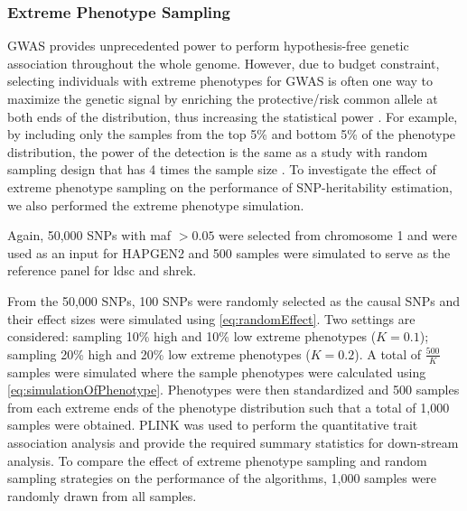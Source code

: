 \documentclass[12pt]{scrbook}
\begin{document}
\subsubsection{Extreme Phenotype Sampling}
\gls{GWAS} provides unprecedented power to perform hypothesis-free genetic association throughout the whole genome.
However, due to budget constraint, selecting individuals with extreme phenotypes for \gls{GWAS} is often one way to maximize the genetic signal by enriching the protective/risk common allele at both ends of the distribution, thus increasing the statistical power \citep{Guey2011}.
For example, by including only the samples from the top 5\% and bottom 5\% of the phenotype distribution, the power of the detection is the same as a study with random sampling design that has 4 times the sample size \citep{Sham2014}. 
To investigate the effect of extreme phenotype sampling on the performance of \gls{SNP}-heritability estimation, we also performed the extreme phenotype simulation. 

Again, 50,000 \glspl{SNP} with \gls{maf} $>0.05$ were selected from chromosome 1 and were used as an input for HAPGEN2 and 500 samples were simulated to serve as the reference panel for \gls{ldsc} and \gls{shrek}.

From the 50,000 \glspl{SNP}, 100 \glspl{SNP} were randomly selected as the causal \glspl{SNP} and their effect sizes were simulated using \cref{eq:randomEffect}.
Two settings are considered: sampling 10\% high and 10\% low extreme phenotypes ($K=0.1$); sampling 20\% high and 20\% low extreme phenotypes ($K=0.2$).
A total of $\frac{500}{K}$ samples were simulated where the sample phenotypes were calculated using \cref{eq:simulationOfPhenotype}.
Phenotypes were then standardized and 500 samples from each extreme ends of the phenotype distribution such that a total of 1,000 samples were obtained. 
PLINK was used to perform the quantitative trait association analysis and provide the required summary statistics for down-stream analysis.
To compare the effect of extreme phenotype sampling and random sampling strategies on the performance of the algorithms, 1,000 samples were randomly drawn from all samples.
\end{document}
